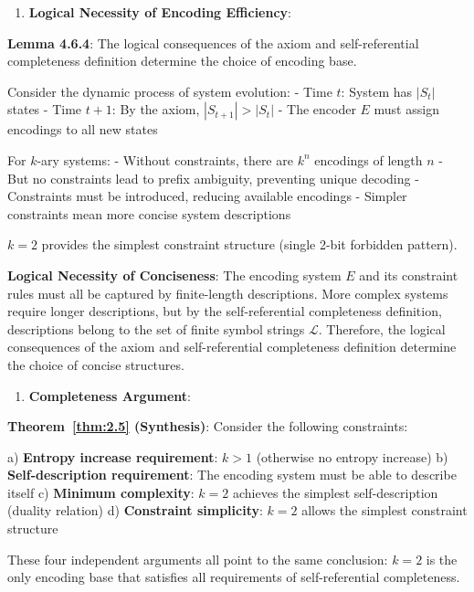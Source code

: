 \begin{enumerate}
\item \textbf{Logical Necessity of Encoding Efficiency}:
\end{enumerate}
   
   \textbf{Lemma 4.6.4}: The logical consequences of the axiom and self-referential completeness definition determine the choice of encoding base.
\label{thm:2.5}
   
   Consider the dynamic process of system evolution:
   - Time $t$: System has $|S_t|$ states
   - Time $t+1$: By the axiom, $|S_{t+1}| > |S_t|$
   - The encoder $E$ must assign encodings to all new states
   
   For $k$-ary systems:
   - Without constraints, there are $k^n$ encodings of length $n$
   - But no constraints lead to prefix ambiguity, preventing unique decoding
   - Constraints must be introduced, reducing available encodings
   - Simpler constraints mean more concise system descriptions
   
   $k=2$ provides the simplest constraint structure (single 2-bit forbidden pattern).
   
   \textbf{Logical Necessity of Conciseness}: The encoding system $E$ and its constraint rules must all be captured by finite-length descriptions. More complex systems require longer descriptions, but by the self-referential completeness definition, descriptions belong to the set of finite symbol strings $\mathcal{L}$. Therefore, the logical consequences of the axiom and self-referential completeness definition determine the choice of concise structures.
   
\begin{enumerate}
\item \textbf{Completeness Argument}:
\end{enumerate}
   
   \textbf{Theorem~\ref{thm:2.5} (Synthesis)}: Consider the following constraints:
\label{thm:2.5}
   
   a) \textbf{Entropy increase requirement}: $k > 1$ (otherwise no entropy increase)
   b) \textbf{Self-description requirement}: The encoding system must be able to describe itself
   c) \textbf{Minimum complexity}: $k=2$ achieves the simplest self-description (duality relation)
   d) \textbf{Constraint simplicity}: $k=2$ allows the simplest constraint structure
   
   These four independent arguments all point to the same conclusion: $k=2$ is the only encoding base that satisfies all requirements of self-referential completeness.
   
